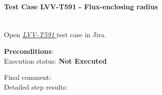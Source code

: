 \documentclass[DM,lsstdraft,STR,toc]{lsstdoc}
\begin{document}
    \paragraph{Test Case LVV-T591 - Flux-enclosing radius
 }\mbox{}\\

Open  \href{https://jira.lsstcorp.org/secure/Tests.jspa#/testCase/LVV-T591}{\textit{ LVV-T591 } }
test case in Jira.

    

    \textbf{ Preconditions}:\\
    

    Execution status: {\bf Not Executed }

    Final comment:\\


    Detailed step results:
\end{document}
